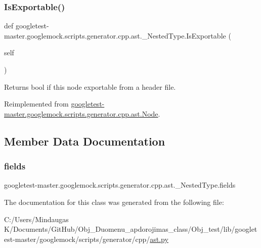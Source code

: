 \subsubsection{\texorpdfstring{IsExportable()}{IsExportable()}}
{\footnotesize\ttfamily def googletest-\/master.\+googlemock.\+scripts.\+generator.\+cpp.\+ast.\+\_\+\+Nested\+Type.\+Is\+Exportable (\begin{DoxyParamCaption}\item[{}]{self }\end{DoxyParamCaption})}

\begin{DoxyVerb}Returns bool if this node exportable from a header file.\end{DoxyVerb}
 

Reimplemented from \mbox{\hyperlink{classgoogletest-master_1_1googlemock_1_1scripts_1_1generator_1_1cpp_1_1ast_1_1_node_a84e05fc36f3b1f650b0aad690ef91c3a}{googletest-\/master.\+googlemock.\+scripts.\+generator.\+cpp.\+ast.\+Node}}.



\subsection{Member Data Documentation}
\mbox{\label{classgoogletest-master_1_1googlemock_1_1scripts_1_1generator_1_1cpp_1_1ast_1_1___nested_type_a5ca114bde3e0c019c39c9727c37a77d9}} 
\subsubsection{\texorpdfstring{fields}{fields}}
{\footnotesize\ttfamily googletest-\/master.\+googlemock.\+scripts.\+generator.\+cpp.\+ast.\+\_\+\+Nested\+Type.\+fields}



The documentation for this class was generated from the following file\+:\begin{DoxyCompactItemize}
\item 
C\+:/\+Users/\+Mindaugas K/\+Documents/\+Git\+Hub/\+Obj\+\_\+\+Duomenu\+\_\+apdorojimas\+\_\+class/\+Obj\+\_\+test/lib/googletest-\/master/googlemock/scripts/generator/cpp/\mbox{\hyperlink{_obj__test_2lib_2googletest-master_2googlemock_2scripts_2generator_2cpp_2ast_8py}{ast.\+py}}\end{DoxyCompactItemize}
